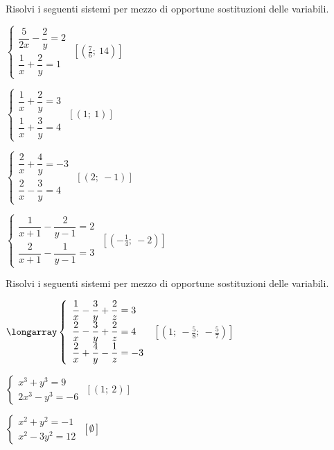 \begin{esercizio}[\Ast]
 \label{ese:22.65}
 Risolvi i seguenti sistemi per mezzo di opportune sostituzioni delle variabili.
\begin{multicols}{2}
\begin{enumeratea}
{\longarray
\item $\left\{\begin{array}{l}
\dfrac{5}{2x}-\dfrac{2}{y}=2\\\dfrac{1}{x}+\dfrac{2}{y}=1
\end{array}\right.$
\hfill $\left[\left(\frac{7}{6};~14\right)\right]$
\item $\left\{\begin{array}{l}
\dfrac{1}{x}+\dfrac{2}{y}=3\\\dfrac{1}{x}+\dfrac{3}{y}=4
\end{array}\right.$
\hfill $\left[\left(1;~1\right)\right]$
\item $\left\{\begin{array}{l}
\dfrac{2}{x}+\dfrac{4}{y}=-3\\\dfrac{2}{x}-\dfrac{3}{y}=4 
\end{array}\right.$
\hfill $\left[\left(2;~-1\right)\right]$
\item $\left\{\begin{array}{l}
\dfrac{1}{x+1}-\dfrac{2}{y-1}=2\\\dfrac{2}{x+1}-\dfrac{1}{y-1}=3
\end{array}\right.$
\hfill $\left[\left(-{\frac{1}{4}};~-2\right)\right]$}
\end{enumeratea}
\end{multicols}
\end{esercizio}

\begin{esercizio}[\Ast]
 \label{ese:22.66}
 Risolvi i seguenti sistemi per mezzo di opportune sostituzioni delle variabili.
\begin{multicols}{2}
\begin{enumeratea}
\item $\longarray\left\{\begin{array}{l}
\dfrac{1}{x}-\dfrac{3}{y}+\dfrac{2}{z}=3 \\
\dfrac{2}{x}-\dfrac{3}{y}+\dfrac{2}{z}=4 \\
\dfrac{2}{x}+\dfrac{4}{y}-\dfrac{1}{z}=-3
\end{array}\right.$
\hfill $\left[\left(1;~-\frac{5}{8};~-\frac{5}{7}\right)\right]$
\item $\left\{\begin{array}{l}
x^{3}+y^{3}=9 \\2x^{3}-y^{3}=-6 
\end{array}\right.$
\hfill $\left[(1;~2)\right]$
\item $\left\{\begin{array}{l}
x^{2}+y^{2}=-1\\x^{2}-3y^{2}=12
\end{array}\right.$
\hfill $\left[\emptyset\right]$
\end{enumeratea}
\end{multicols}
\end{esercizio}

